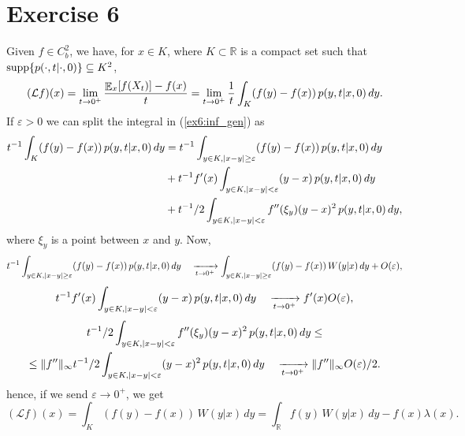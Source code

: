 \documentclass[a4paper,11pt]{article}
\theoremstyle{definition}
\theoremstyle{plain}
\theoremstyle{remark}
\DeclarePairedDelimiter{\abs}{\lvert}{\rvert}
\DeclarePairedDelimiter{\norm}{\lVert}{\rVert}
\DeclarePairedDelimiter{\parq}{[}{]}
\DeclarePairedDelimiter{\bra}{\lbrace}{\rbrace}
\DeclareMathOperator*{\expval}{\mathbb{E}}
\begin{document}
\section*{Exercise 6}

Given $f\in C^2_b$, we have, for $x\in K$, where $K\subset\mathbb{R}$ is a compact set such that $\mathrm{supp}\bra{p(\cdot,t|\cdot,0)}\subseteq K^2$, 
\begin{equation}\label{ex6:inf_gen}
(\mathcal{L}f)(x) = \lim_{t\to 0^+}\frac{\expval_x\parq{f(X_t)} - f(x)}{t} = \lim_{t\to 0^+}\frac{1}{t}\int_K (f(y)-f(x))\,p(y,t|x,0)\,dy. 
\end{equation}
If $\varepsilon>0$ we can split the integral in (\ref{ex6:inf_gen}) as
\begin{align*}
t^{-1}\int_K (f(y)-f(x))\,p(y,t|x,0)\,dy & = t^{-1}\int_{y\in K, \abs{x-y}\geq\varepsilon} (f(y)-f(x))\,p(y,t|x,0)\,dy \\ & + t^{-1}f'(x)\int_{y\in K, \abs{x-y}<\varepsilon} (y-x)\,p(y,t|x,0)\,dy \\ & + t^{-1}/2\int_{y\in K, \abs{x-y}<\varepsilon} f''(\xi_y)(y-x)^2\,p(y,t|x,0)\,dy,
\end{align*}
where $\xi_y$ is a point between $x$ and $y$. Now,
$$
t^{-1}\int_{y\in K, \abs{x-y}\geq\varepsilon} (f(y)-f(x))\,p(y,t|x,0)\,dy \quad  \xrightarrow[t\to0^+] \quad \int_{y\in K, \abs{x-y}\geq\varepsilon} (f(y)-f(x))\,W(y|x)\,dy + O(\varepsilon),
$$
$$
t^{-1}f'(x)\int_{y\in K, \abs{x-y}<\varepsilon} (y-x)\,p(y,t|x,0)\,dy \quad  \xrightarrow[t\to0^+] \quad f'(x)O(\varepsilon), 
$$
\begin{multline*}
t^{-1}/2\int_{y\in K, \abs{x-y}<\varepsilon} f''(\xi_y)(y-x)^2\,p(y,t|x,0)\,dy \leq \\ \leq \norm{f''}_\infty t^{-1}/2\int_{y\in K, \abs{x-y}<\varepsilon} (y-x)^2\,p(y,t|x,0)\,dy \quad  \xrightarrow[t\to0^+] \quad \norm{f''}_\infty O(\varepsilon)/2.
\end{multline*}
hence, if we send $\varepsilon\to 0^+$, we get
$$
(\mathcal{L}f)(x) = \int_{K} (f(y)-f(x))\,W(y|x)\,dy = \int_\mathbb{R} f(y)\,W(y|x)\,dy - f(x)\lambda(x).
$$
\end{document}
